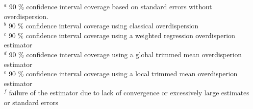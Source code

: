 \documentclass[12pt, titlepage]{article}\usepackage[]{graphicx}\usepackage[]{color}
\begin{document}
\begin{table}[ht]
\begin{center}
\begin{tabular}{rrrrrr}
   \hline
\end{tabular}
\end{center}
\textrm{$^a$ 90 \% confidence interval coverage based on standard errors without overdispersion.} \\ 
\textrm{$^b$ 90 \% confidence interval coverage using classical overdispersion} \\
\textrm{$^c$ 90 \% confidence interval coverage using a weighted regression overdisperion estimator} \\
\textrm{$^d$ 90 \% confidence interval coverage using a global trimmed mean overdisperion estimator} \\
\textrm{$^e$ 90 \% confidence interval coverage using a local trimmed mean overdisperion estimator} \\
\textrm{$^f$ failure of the estimator due to lack of convergence or excessively large estimates or standard errors} \\
\end{table}

\end{document}
